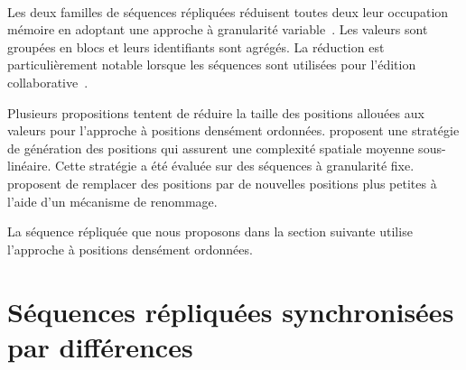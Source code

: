 
\paragraph{}Les deux familles de séquences répliquées réduisent toutes deux leur occupation mémoire en adoptant une approche à granularité variable~\cite{yu_2012_string-wise-crdt, andre_2013_logootsplit, briot_2016_rgasplit}.
Les valeurs sont groupées en blocs et leurs identifiants sont agrégés.
La réduction est particulièrement notable lorsque les séquences sont utilisées pour l'édition collaborative~\autocite{andre_2013_logootsplit,briot_2016_rgasplit}.

Plusieurs propositions tentent de réduire la taille des positions allouées aux valeurs pour l'approche à positions densément ordonnées.
\textcite{nedelec_2013_lseq} proposent une stratégie de génération des positions qui assurent une complexité spatiale moyenne sous-linéaire.
Cette stratégie a été évaluée sur des séquences à granularité fixe.
\textcite{nicolas2020_renaming} proposent de remplacer des positions par de nouvelles positions plus petites à l'aide d'un mécanisme de renommage.


La séquence répliquée que nous proposons dans la section suivante utilise l'approche à positions densément ordonnées.


\section{Séquences répliquées synchronisées par différences}\label{sec:delta-seq}


